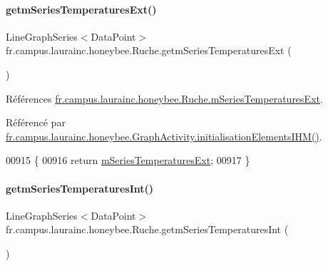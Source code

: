 \paragraph{\texorpdfstring{getm\+Series\+Temperatures\+Ext()}{getmSeriesTemperaturesExt()}}
{\footnotesize\ttfamily Line\+Graph\+Series$<$Data\+Point$>$ fr.\+campus.\+laurainc.\+honeybee.\+Ruche.\+getm\+Series\+Temperatures\+Ext (\begin{DoxyParamCaption}{ }\end{DoxyParamCaption})}



Références \hyperlink{classfr_1_1campus_1_1laurainc_1_1honeybee_1_1_ruche_a67713d2f8d0adba8ac6ef782001e23a1}{fr.\+campus.\+laurainc.\+honeybee.\+Ruche.\+m\+Series\+Temperatures\+Ext}.



Référencé par \hyperlink{classfr_1_1campus_1_1laurainc_1_1honeybee_1_1_graph_activity_a7000895983725c6f795f7c73c1fafd20}{fr.\+campus.\+laurainc.\+honeybee.\+Graph\+Activity.\+initialisation\+Elements\+I\+H\+M()}.


\begin{DoxyCode}
00915                                                                   \{
00916         \textcolor{keywordflow}{return} \hyperlink{classfr_1_1campus_1_1laurainc_1_1honeybee_1_1_ruche_a67713d2f8d0adba8ac6ef782001e23a1}{mSeriesTemperaturesExt};
00917     \}
\end{DoxyCode}
\mbox{\label{classfr_1_1campus_1_1laurainc_1_1honeybee_1_1_ruche_ae3f7d6c16444905061f13fe14eb21d69}} 
\paragraph{\texorpdfstring{getm\+Series\+Temperatures\+Int()}{getmSeriesTemperaturesInt()}}
{\footnotesize\ttfamily Line\+Graph\+Series$<$Data\+Point$>$ fr.\+campus.\+laurainc.\+honeybee.\+Ruche.\+getm\+Series\+Temperatures\+Int (\begin{DoxyParamCaption}{ }\end{DoxyParamCaption})}



